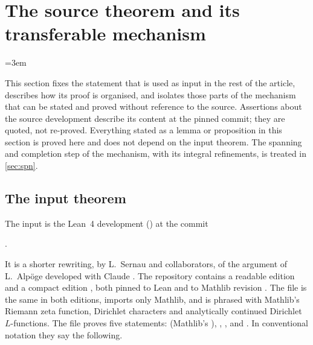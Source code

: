 \section{The source theorem and its transferable mechanism}\label{sec:src}

\providecommand{\srcrem}{\mathrm{rem}}
\providecommand{\srcB}{\mathcal{B}}
\providecommand{\srcT}{\mathcal{T}}
\providecommand{\srcRR}{\mathcal{R}}
\providecommand{\srctr}{\mathsf{T}}
\begingroup\emergencystretch=3em

This section fixes the statement that is used as input in the rest of the article, describes
how its proof is organised, and isolates those parts of the mechanism that can be stated and
proved without reference to the source. Assertions about the source development describe its
content at the pinned commit; they are quoted, not re-proved. Everything stated as a lemma or
proposition in this section is proved here and does not depend on the input theorem. The
spanning and completion step of the mechanism, with its integral refinements, is treated in
\cref{sec:spn}.

\subsection{The input theorem}\label{src:sec:input}
\begingroup\raggedright
{}
\endgroup

The input is the Lean~4 development \repo{} () \cite{Sernau2026GRH} at
the commit
\begin{center}
.
\end{center}
It is a shorter
rewriting, by L.~Sernau and collaborators, of the argument of L.~Alp\"oge developed with
Claude \cite{Alpoge2026Remark}. The repository contains a readable edition  and a
compact edition , both pinned to Lean  and to Mathlib revision
. The file  is the same
in both editions, imports only Mathlib, and is phrased with Mathlib's Riemann zeta function,
Dirichlet characters and analytically continued Dirichlet $L$-functions. The file
 proves five statements:  (Mathlib's
), ,
,  and
. In conventional notation they say the following.


